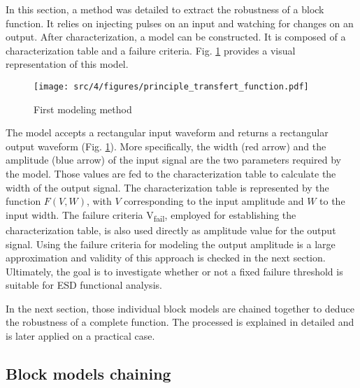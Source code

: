 In this section, a method was detailed to extract the robustness of a block function.
It relies on injecting pulses on an input and watching for changes on an output.
After characterization, a model can be constructed.
It is composed of a characterization table and a failure criteria.
Fig. \ref{fig:principle-transfert-func} provides a visual representation of this model.

\begin{figure}[!h]
  \centering
  \texttt{[image: src/4/figures/principle\_transfert\_function.pdf]}
  \caption{First modeling method}
  \label{fig:principle-transfert-func}
\end{figure}

The model accepts a rectangular input waveform and returns a rectangular output waveform (Fig. \ref{fig:principle-transfert-func}).
More specifically, the width (red arrow) and the amplitude (blue arrow) of the input signal are the two parameters required by the model.
Those values are fed to the characterization table to calculate the width of the output signal.
The characterization table is represented by the function $F(V,W)$, with $V$ corresponding to the input amplitude and $W$ to the input width.
The failure criteria V\textsubscript{fail}, employed for establishing the characterization table, is also used directly as amplitude value for the output signal.
Using the failure criteria for modeling the output amplitude is a large approximation and validity of this approach is checked in the next section.
Ultimately, the goal is to investigate whether or not a fixed failure threshold is suitable for ESD functional analysis.

In the next section, those individual block models are chained together to deduce the robustness of a complete function.
The processed is explained in detailed and is later applied on a practical case.

\subsection{Block models chaining}
\label{sec:block-chaining}

